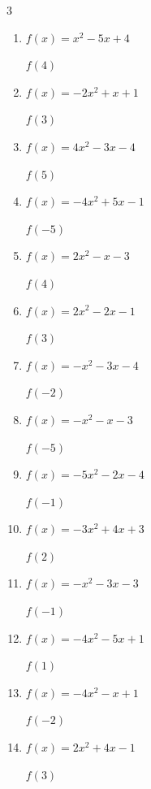 \begin{multicols}{3}
\begin{enumerate}
  \item $f(x)=x^{2}-5x+4$

$f(4)$
        \phantom{$= 0$}

\columnbreak %

  \item $f(x)=-2x^{2}+x+1$

$f(3)$
        \phantom{$= -14$}

  \item $f(x)=4x^{2}-3x-4$

$f(5)$
        \phantom{$= 81$}

  \item $f(x)=-4x^{2}+5x-1$

$f(-5)$
        \phantom{$= -126$}

  \item $f(x)=2x^{2}-x-3$

$f(4)$
        \phantom{$= 25$}

  \item $f(x)=2x^{2}-2x-1$

$f(3)$
        \phantom{$= 11$}

  \item $f(x)=-x^{2}-3x-4$

$f(-2)$
        \phantom{$= -2$}

  \item $f(x)=-x^{2}-x-3$

$f(-5)$
        \phantom{$= -23$}

  \item $f(x)=-5x^{2}-2x-4$

$f(-1)$
        \phantom{$= -7$}

  \item $f(x)=-3x^{2}+4x+3$

$f(2)$
        \phantom{$= -1$}

  \item $f(x)=-x^{2}-3x-3$

$f(-1)$
        \phantom{$= -1$}

  \item $f(x)=-4x^{2}-5x+1$

$f(1)$
        \phantom{$= -8$}

  \item $f(x)=-4x^{2}-x+1$

$f(-2)$
        \phantom{$= -13$}

  \item $f(x)=2x^{2}+4x-1$

$f(3)$
        \phantom{$= 29$}


\end{enumerate}
\end{multicols}
